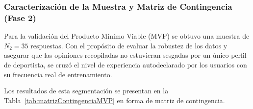 \subsubsection{Caracterización de la Muestra y Matriz de Contingencia (Fase 2)}

Para la validación del Producto Mínimo Viable (MVP) se obtuvo una muestra de $N_2 = 35$ respuestas. Con el propósito de evaluar la robustez de los datos y asegurar que las opiniones recopiladas no estuvieran sesgadas por un único perfil de deportista, se cruzó el nivel de experiencia autodeclarado por los usuarios con su frecuencia real de entrenamiento.

Los resultados de esta segmentación se presentan en la Tabla~\ref{tab:matrizContingenciaMVP} en forma de matriz de contingencia.

\begin{table}[htbp]
\centering
\small
\renewcommand{\arraystretch}{1.3}
\caption{Matriz de contingencia de la Fase 2: Distribución cruzada entre nivel de \textit{expertise} y frecuencia de escalada.}
\label{tab:matrizContingenciaMVP}
\end{table}

